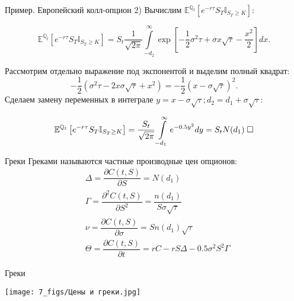 \documentclass{beamer}
\newcommand*{\QEDB}{\null\nobreak\hfill\ensuremath{\square}}
\begin{document}
\begin{frame}{Пример. Европейский колл-опцион}
    2) Вычислим $\mathbb{E}^{\mathbb{Q}_t}\left[e^{-r\tau} S_T \mathbb{I}_{S_T \geq K}\right]$:

    $$
        \mathbb{E}^{\mathbb{Q}_t}\left[e^{-r\tau} S_T \mathbb{I}_{S_T \geq K}\right]  
    = S_t \dfrac{1}{\sqrt{2\pi}}\int\limits_{-d_2}^{\infty} \exp\left[-\dfrac{1}{2} \sigma^2\tau + \sigma x \sqrt{\tau}-\frac{x^2}{2} \right]dx.
    $$

    Рассмотрим отдельно выражение под экспонентой и выделим полный квадрат:
    $$
        -\dfrac{1}{2}\left(\sigma^2 \tau - 2x\sigma \sqrt{\tau} + x^2 \right) = -\dfrac{1}{2} \left(x-\sigma \sqrt{\tau} \right)^2.
    $$
    Сделаем замену переменных в интеграле 
    $y = x - \sigma \sqrt{\tau}; d_2 = d_1 + \sigma \sqrt{\tau}$:

    $$
        \mathbb{E}^{\mathbb{Q}_t}\left[e^{-r\tau} S_T \mathbb{I}_{S_T \geq K}\right]  
    = \dfrac{S_t}{\sqrt{2\pi}}\int\limits_{-d_1}^{\infty} e^{-0.5y^2}dy
     = S_t N(d_1) \; \QEDB
    $$
    
\end{frame}

\begin{frame}{Греки}
    Греками называются частные производные цен опционов:
    \begin{align*}
        &\Delta = \dfrac{\partial C(t, S)}{\partial S} = N(d_1) \\
        &\Gamma = \dfrac{\partial^2 C(t, S)}{\partial S^2} = \dfrac{n(d_1)}{S\sigma \sqrt{\tau}}\\
        &\nu = \dfrac{\partial C(t, S)}{\partial \sigma} = S n(d_1)\sqrt{\tau}\\
        &\Theta = \dfrac{\partial C(t, S)}{\partial t} = rC - r S \Delta - 0.5 \sigma^2 S^2 \Gamma
    \end{align*}
\end{frame}

\begin{frame}{Греки}
    \begin{center}
        \texttt{[image: 7\_figs/Цены и греки.jpg]}
    \end{center}
\end{frame}
\end{document}
